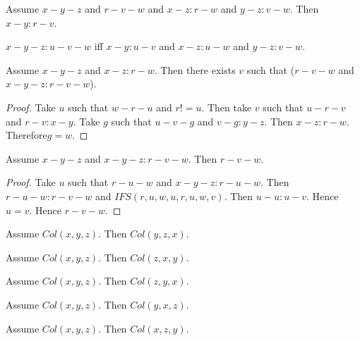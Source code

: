 \documentclass{article}
\begin{document}
  \begin{forthel}
    \begin{axiom}[L4_3]
      Assume $x-y-z$ and $r-v-w$ and $x-z : r-w$ and $y-z : v-w$. Then $x-y : r-v$.
    \end{axiom}

    \begin{definition}[L4_4]
      $x-y-z : u-v-w$ iff $x-y : u-v$ and $x-z : u-w$ and $y-z : v-w$.
    \end{definition}

    \begin{lemma}[L4_5]
      Assume $x-y-z$ and $x-z : r-w$. Then there exists $v$ such that ($r-v-w$ and $x-y-z : r-v-w$).
    \end{lemma}
    \begin{proof}
    	Take $u$ such that $w-r-u$ and $r != u$. Then take $v$ such that $u-r-v$ and $r-v : x-y$. Take $g$ such that $u-v-g$ and $v-g : y-z$. Then $x-z : r-w$. Therefore$ g = w$.
    \end{proof}

    \begin{lemma}[L4_6]
      Assume $x-y-z$ and $x-y-z : r-v-w$. Then $r-v-w$.
    \end{lemma}
    \begin{proof}
    	Take $u$ such that $r-u-w$ and $x-y-z : r-u-w$.	Then $r-u-w : r-v-w$ and $IFS(r,u,w,u,r,u,w,v)$.	Then $u-u : u-v$. Hence $u = v$. Hence $r-v-w$.
    \end{proof}

    \begin{lemma}[L4_11a]
      Assume $Col(x,y,z)$. Then $Col(y,z,x)$.
    \end{lemma}

    \begin{lemma}[L4_11b]
      Assume $Col(x,y,z)$. Then $Col(z,x,y)$.
    \end{lemma}

    \begin{lemma}[L4_11c]
      Assume $Col(x,y,z)$. Then $Col(z,y,x)$.
    \end{lemma}

    \begin{lemma}[L4_11d]
      Assume $Col(x,y,z)$. Then $Col(y,x,z)$.
    \end{lemma}

    \begin{lemma}[L4_11e]
      Assume $Col(x,y,z)$. Then $Col(x,z,y)$.
    \end{lemma}


\end{forthel}
\end{document}
